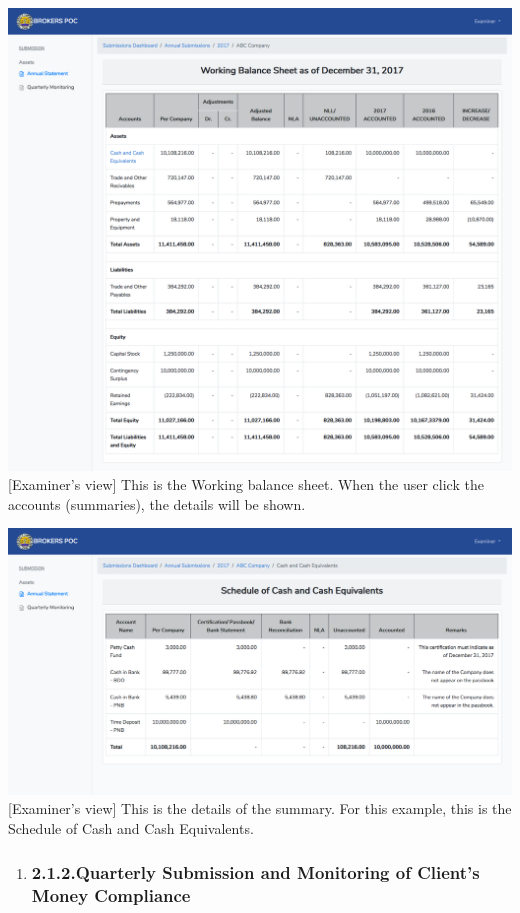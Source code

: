 \documentclass{article}
\begin{document}
\includegraphics[keepaspectratio=true]{up-ic-screens/image35}{}[Examiner’s view] This is the Working balance sheet. When
the user click the accounts (summaries), the details will be
shown.%

\includegraphics[keepaspectratio=true]{up-ic-screens/image135}{}[Examiner’s view] This is the details of the summary. For
this example, this is the Schedule of Cash and Cash Equivalents.%

\begin{enumerate}[noitemsep,topsep=\mdcompacttopsep]%

\item{}
\subsubsection{2.1.2.\hspace*{0.5em}Quarterly Submission and Monitoring of Client’s Money Compliance}\label{sec-quarterly-submission-and-monitoring-of-clients-money-compliance}%
\end{enumerate}%
\end{document}
